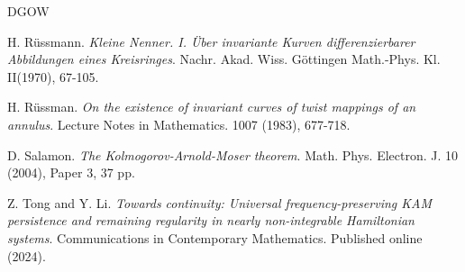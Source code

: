 \documentclass{amsart}
\newcounter{item}[section]
\theoremstyle{definition}
\begin{document}
\begin{thebibliography}{DGOW}
			
			
			
			
			 H. R\"{u}ssmann.  {\it Kleine Nenner. I. \"{U}ber invariante Kurven differenzierbarer Abbildungen eines Kreisringes}. Nachr. Akad. Wiss. G\"{o}ttingen Math.-Phys. Kl. II(1970), 67-105.
			
			
			
			 H. R\"{u}ssman. {\it On the existence of invariant curves of twist mappings of an annulus}.
			Lecture Notes in Mathematics.  {1007} (1983),  677-718.
			
			
			
			
			 D. Salamon. {\it The Kolmogorov-Arnold-Moser theorem}.
			Math. Phys. Electron. J. 10 (2004), Paper 3, 37 pp.
			
			
			 Z. Tong and Y. Li. {\it Towards continuity: Universal frequency-preserving KAM persistence and remaining regularity in nearly non-integrable Hamiltonian systems}.
			Communications in Contemporary Mathematics. Published online (2024).
			
			
			

\end{thebibliography}
\end{document}
